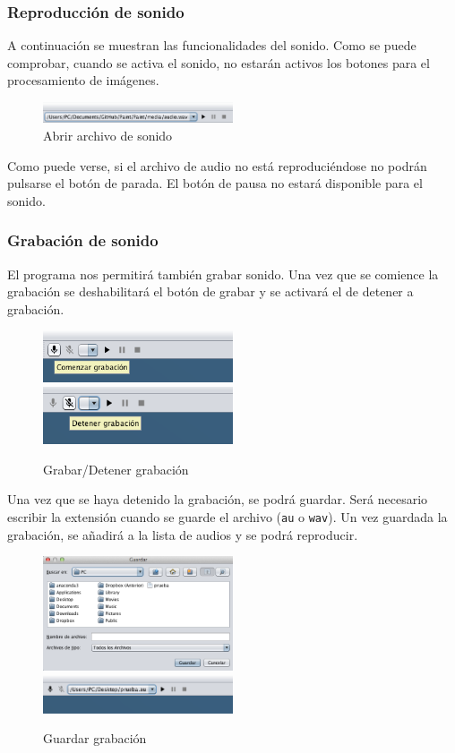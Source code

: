 \subsubsection{Reproducción de sonido}
A continuación se muestran las funcionalidades del sonido. Como se puede comprobar, cuando se activa el sonido, no estarán activos los botones para el procesamiento de imágenes.
\vskip0.3cm
\begin{figure}[H]
 \centering
  \includegraphics[width=0.5\textwidth]{sonido/archivoAbierto.png}
 \caption{Abrir archivo de sonido}
 \label{diseño}
 \end{figure}
Como puede verse, si el archivo de audio no está reproduciéndose no podrán pulsarse el botón de parada. El botón de pausa no estará disponible para el sonido.
\subsubsection{Grabación de sonido}
El programa nos permitirá también grabar sonido. Una vez que se comience la grabación se deshabilitará el botón de grabar y se activará el de detener a grabación.
\vskip0.3cm
\begin{figure}[H]
 \centering
  \includegraphics[width=0.5\textwidth]{sonido/grabacion1.png}
  \includegraphics[width=0.5\textwidth]{sonido/grabacion2.png}
 \caption{Grabar/Detener grabación}
 \label{diseño}
 \end{figure}
 Una vez que se haya detenido la grabación, se podrá guardar. Será necesario escribir la extensión cuando se guarde el archivo (\texttt{au} o \texttt{wav}). Un vez guardada la grabación, se añadirá a la lista de audios y se podrá reproducir.
 \vskip0.3cm
\begin{figure}[H]
 \centering
  \includegraphics[width=0.5\textwidth]{sonido/grabacion3.png}
  \includegraphics[width=0.5\textwidth]{sonido/grabacion4.png}
 \caption{Guardar grabación}
 \label{diseño}
 \end{figure}
